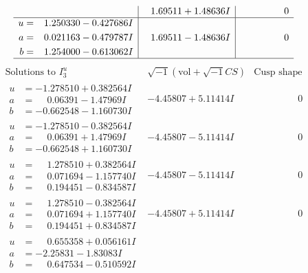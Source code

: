 \documentclass[1p]{elsarticle_modified}
\theoremstyle{definition}
\newcommand{\I}{\sqrt{-1}}
\begin{document}
$$\begin{array}{c|c|c}
 & \phantom{-}1.69511 + 1.48636 I & \phantom{-0.000000 } 0 \\ \hline\begin{aligned}
u &= \phantom{-}1.250330 - 0.427686 I \\
a &= \phantom{-}0.021163 - 0.479787 I \\
b &= \phantom{-}1.254000 - 0.613062 I\end{aligned}
 & \phantom{-}1.69511 - 1.48636 I & \phantom{-0.000000 } 0\\
 \hline 
 \end{array}$$\newpage$$\begin{array}{c|c|c}  
\text{Solutions to }I^u_{3}& \I (\text{vol} + \sqrt{-1}CS) & \text{Cusp shape}\\
 \hline 
\begin{aligned}
u &= -1.278510 + 0.382564 I \\
a &= \phantom{-}0.06391 - 1.47969 I \\
b &= -0.662548 - 1.160730 I\end{aligned}
 & -4.45807 + 5.11414 I & \phantom{-0.000000 } 0 \\ \hline\begin{aligned}
u &= -1.278510 - 0.382564 I \\
a &= \phantom{-}0.06391 + 1.47969 I \\
b &= -0.662548 + 1.160730 I\end{aligned}
 & -4.45807 - 5.11414 I & \phantom{-0.000000 } 0 \\ \hline\begin{aligned}
u &= \phantom{-}1.278510 + 0.382564 I \\
a &= \phantom{-}0.071694 - 1.157740 I \\
b &= \phantom{-}0.194451 - 0.834587 I\end{aligned}
 & -4.45807 - 5.11414 I & \phantom{-0.000000 } 0 \\ \hline\begin{aligned}
u &= \phantom{-}1.278510 - 0.382564 I \\
a &= \phantom{-}0.071694 + 1.157740 I \\
b &= \phantom{-}0.194451 + 0.834587 I\end{aligned}
 & -4.45807 + 5.11414 I & \phantom{-0.000000 } 0 \\ \hline\begin{aligned}
u &= \phantom{-}0.655358 + 0.056161 I \\
a &= -2.25831 - 1.83083 I \\
b &= \phantom{-}0.647534 - 0.510592 I\end{aligned}

\end{array}$$
\end{document}
